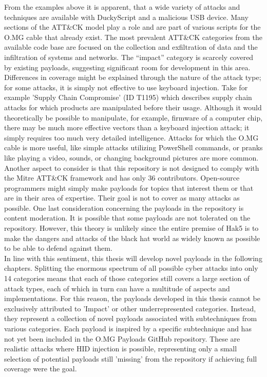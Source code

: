 From the examples above it is apparent, that a wide variety of attacks and techniques are available with DuckyScript and a malicious USB device. Many sections of the ATT\&CK model play a role and are part of various scripts for the O.MG cable that already exist. The most prevalent ATT\&CK categories from the available code base are focused on the collection and exfiltration of data and the infiltration of systems and networks. The ``impact'' category is scarcely covered by existing payloads, suggesting significant room for development in this area.
Differences in coverage might be explained through the nature of the attack type; for some attacks, it is simply not effective to use keyboard injection. Take for example 'Supply Chain Compromise' (ID T1195) which describes supply chain attacks for which products are manipulated before their usage. Although it would theoretically be possible to manipulate, for example, firmware of a computer chip, there may be much more effective vectors than a keyboard injection attack; it simply requires too much very detailed intelligence. Attacks for which the O.MG cable is more useful, like simple attacks utilizing PowerShell commands, or pranks like playing a video, sounds, or changing background pictures are more common. 
Another aspect to consider is that this repository is not designed to comply with the Mitre ATT\&CK framework and has only 36 contributors. Open-source programmers might simply make payloads for topics that interest them or that are in their area of expertise. Their goal is not to cover as many attacks as possible. One last consideration concerning the payloads in the repository is content moderation. It is possible that some payloads are not tolerated on the repository. However, this theory is unlikely since the entire premise of Hak5 is to make the dangers and attacks of the black hat world as widely known as possible to be able to defend against them.\\  
In line with this sentiment, this thesis will develop novel payloads in the following chapters. Splitting the enormous spectrum of all possible cyber attacks into only 14 categories means that each of those categories still covers a large section of attack types, each of which in turn can have a multitude of aspects and implementations. For this reason, the payloads developed in this thesis cannot be exclusively attributed to 'Impact' or other underrepresented categories. Instead, they represent a collection of novel payloads associated with subtechniques from various categories. Each payload is inspired by a specific subtechnique and has not yet been included in the O.MG Payloads GitHub repository. These are realistic attacks where HID injection is possible, representing only a small selection of potential payloads still 'missing' from the repository if achieving full coverage were the goal.

